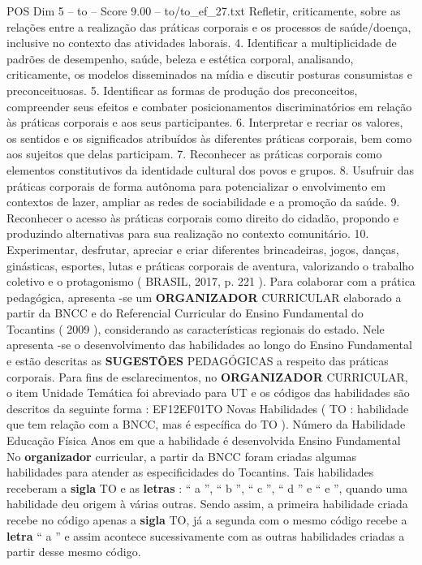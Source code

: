 \begin{textsample}{POS Dim 5 – to – Score 9.00 – to/to\_ef\_27.txt}
Refletir, criticamente, sobre as relações entre a realização das práticas corporais e os processos de saúde/doença, inclusive no contexto das atividades laborais. 4.
Identificar a multiplicidade de padrões de desempenho, saúde, beleza e estética corporal, analisando, criticamente, os modelos disseminados na mídia e discutir posturas consumistas e preconceituosas. 5.
Identificar as formas de produção dos preconceitos, compreender seus efeitos e combater posicionamentos discriminatórios em relação às práticas corporais e aos seus participantes. 6.
Interpretar e recriar os valores, os sentidos e os significados atribuídos às diferentes práticas corporais, bem como aos sujeitos que delas participam. 7.
Reconhecer as práticas corporais como elementos constitutivos da identidade cultural dos povos e grupos. 8.
Usufruir das práticas corporais de forma autônoma para potencializar o envolvimento em contextos de lazer, ampliar as redes de sociabilidade e a promoção da saúde. 9.
Reconhecer o acesso às práticas corporais como direito do cidadão, propondo e produzindo alternativas para sua realização no contexto comunitário. 10.
Experimentar, desfrutar, apreciar e criar diferentes brincadeiras, jogos, danças, ginásticas, esportes, lutas e práticas corporais de aventura, valorizando o trabalho coletivo e o protagonismo ( BRASIL, 2017, p. 221 ).
Para colaborar com a prática pedagógica, apresenta -se um \textbf{ORGANIZADOR} CURRICULAR elaborado a partir da BNCC e do Referencial Curricular do Ensino Fundamental do Tocantins ( 2009 ), considerando as características regionais do estado.
Nele apresenta -se o desenvolvimento das habilidades ao longo do Ensino Fundamental e estão descritas as \textbf{SUGESTÕES} PEDAGÓGICAS a respeito das práticas corporais.
Para fins de esclarecimentos, no \textbf{ORGANIZADOR} CURRICULAR, o item Unidade Temática foi abreviado para UT e os códigos das habilidades são descritos da seguinte forma : EF12EF01TO Novas Habilidades ( TO : habilidade que tem relação com a BNCC, mas é específica do TO ).
Número da Habilidade Educação Física Anos em que a habilidade é desenvolvida Ensino Fundamental No \textbf{organizador} curricular, a partir da BNCC foram criadas algumas habilidades para atender as especificidades do Tocantins.
Tais habilidades receberam a \textbf{sigla} TO e as \textbf{letras} : “ a ”, “ b ”, “ c ”, “ d ” e “ e ”, quando uma habilidade deu origem à várias outras.
Sendo assim, a primeira habilidade criada recebe no código apenas a \textbf{sigla} TO, já a segunda com o mesmo código recebe a \textbf{letra} “ a ” e assim acontece sucessivamente com as outras habilidades criadas a partir desse mesmo código.

\end{textsample}
